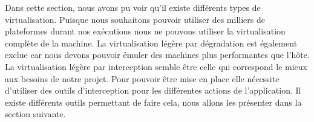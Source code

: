 Dans cette section, nous avons pu voir qu'il existe différents types de virtualisation. Puisque nous souhaitons pouvoir utiliser des milliers de plateformes durant nos exécutions nous ne pouvons utiliser la virtualisation complète de la machine. La virtualisation légère par dégradation est également exclue car nous devons pouvoir émuler des machines plus performantes que l'hôte. La virtualisation légère par interception semble être celle qui correspond le mieux aux besoins de notre projet. Pour pouvoir être mise en place elle nécessite d'utiliser des outils d'interception pour les différentes actions de l'application. Il existe différents outils permettant de faire cela, nous allons les présenter dans la section suivante.
